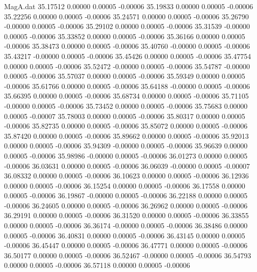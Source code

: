 \begin{filecontents}{MagA.dat}
  35.17512    0.00000    0.00005   -0.00006
  35.19833    0.00000    0.00005   -0.00006
  35.22256    0.00000    0.00005   -0.00006
  35.24571    0.00000    0.00005   -0.00006
  35.26790   -0.00000    0.00005   -0.00006
  35.29102    0.00000    0.00005   -0.00006
  35.31539   -0.00000    0.00005   -0.00006
  35.33852    0.00000    0.00005   -0.00006
  35.36166    0.00000    0.00005   -0.00006
  35.38473    0.00000    0.00005   -0.00006
  35.40760   -0.00000    0.00005   -0.00006
  35.43217   -0.00000    0.00005   -0.00006
  35.45426    0.00000    0.00005   -0.00006
  35.47754    0.00000    0.00005   -0.00006
  35.52472   -0.00000    0.00005   -0.00006
  35.54787   -0.00000    0.00005   -0.00006
  35.57037    0.00000    0.00005   -0.00006
  35.59349    0.00000    0.00005   -0.00006
  35.61766    0.00000    0.00005   -0.00006
  35.64188   -0.00000    0.00005   -0.00006
  35.66395    0.00000    0.00005   -0.00006
  35.68734    0.00000    0.00005   -0.00006
  35.71105   -0.00000    0.00005   -0.00006
  35.73452    0.00000    0.00005   -0.00006
  35.75683    0.00000    0.00005   -0.00007
  35.78003    0.00000    0.00005   -0.00006
  35.80317    0.00000    0.00005   -0.00006
  35.82735    0.00000    0.00005   -0.00006
  35.85072    0.00000    0.00005   -0.00006
  35.87420    0.00000    0.00005   -0.00006
  35.89662    0.00000    0.00005   -0.00006
  35.92013    0.00000    0.00005   -0.00006
  35.94309   -0.00000    0.00005   -0.00006
  35.96639    0.00000    0.00005   -0.00006
  35.98986   -0.00000    0.00005   -0.00006
  36.01273    0.00000    0.00005   -0.00006
  36.03631    0.00000    0.00005   -0.00006
  36.06039   -0.00000    0.00005   -0.00007
  36.08332    0.00000    0.00005   -0.00006
  36.10623    0.00000    0.00005   -0.00006
  36.12936    0.00000    0.00005   -0.00006
  36.15254    0.00000    0.00005   -0.00006
  36.17558    0.00000    0.00005   -0.00006
  36.19867   -0.00000    0.00005   -0.00006
  36.22188    0.00000    0.00005   -0.00006
  36.24605    0.00000    0.00005   -0.00006
  36.26962    0.00000    0.00005   -0.00006
  36.29191    0.00000    0.00005   -0.00006
  36.31520    0.00000    0.00005   -0.00006
  36.33855    0.00000    0.00005   -0.00006
  36.36174   -0.00000    0.00005   -0.00006
  36.38486    0.00000    0.00005   -0.00006
  36.40831    0.00000    0.00005   -0.00006
  36.43145    0.00000    0.00005   -0.00006
  36.45447    0.00000    0.00005   -0.00006
  36.47771    0.00000    0.00005   -0.00006
  36.50177    0.00000    0.00005   -0.00006
  36.52467   -0.00000    0.00005   -0.00006
  36.54793    0.00000    0.00005   -0.00006
  36.57118    0.00000    0.00005   -0.00006

\end{filecontents}
